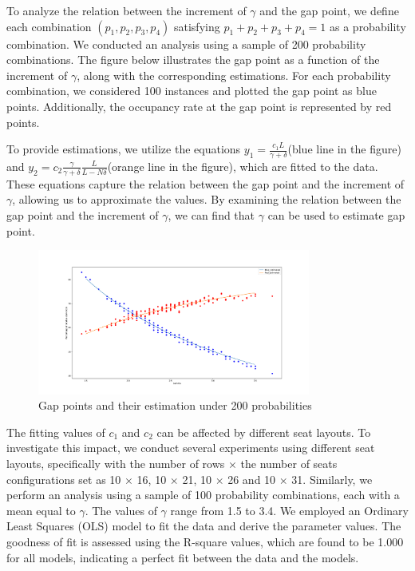 To analyze the relation between the increment of $\gamma$ and the gap point, we define each combination $(p_1, p_2, p_3, p_4)$ satisfying $p_1 + p_2 + p_3 + p_4 = 1$ as a probability combination. We conducted an analysis using a sample of 200 probability combinations. The figure below illustrates the gap point as a function of the increment of $\gamma$, along with the corresponding estimations. For each probability combination, we considered 100 instances and plotted the gap point as blue points. Additionally, the occupancy rate at the gap point is represented by red points.

To provide estimations, we utilize the equations $y_1 = \frac{c_1 L}{\gamma + \delta}$(blue line in the figure) and $y_2 = c_2 \frac{\gamma}{\gamma + \delta} \frac{L}{L-N \delta}$(orange line in the figure), which are fitted to the data. These equations capture the relation between the gap point and the increment of $\gamma$, allowing us to approximate the values. By examining the relation between the gap point and the increment of $\gamma$, we can find that $\gamma$ can be used to estimate gap point.

\begin{figure}[ht]
  \centering
    \includegraphics[width=0.8\textwidth]{./Figures/re2.pdf}
  \caption{Gap points and their estimation under 200 probabilities}
\end{figure}



The fitting values of $c_1$ and $c_2$ can be affected by different seat layouts. To investigate this impact, we conduct several experiments using different seat layouts, specifically with the number of rows $\times$ the number of seats configurations set as 10 $\times$ 16, 10 $\times$ 21, 10 $\times$ 26 and 10 $\times$ 31. Similarly, we perform an analysis using a sample of 100 probability combinations, each with a mean equal to $\gamma$. The values of $\gamma$ range from 1.5 to 3.4. We employed an Ordinary Least Squares (OLS) model to fit the data and derive the parameter values. The goodness of fit is assessed using the R-square values, which are found to be 1.000 for all models, indicating a perfect fit between the data and the models.

